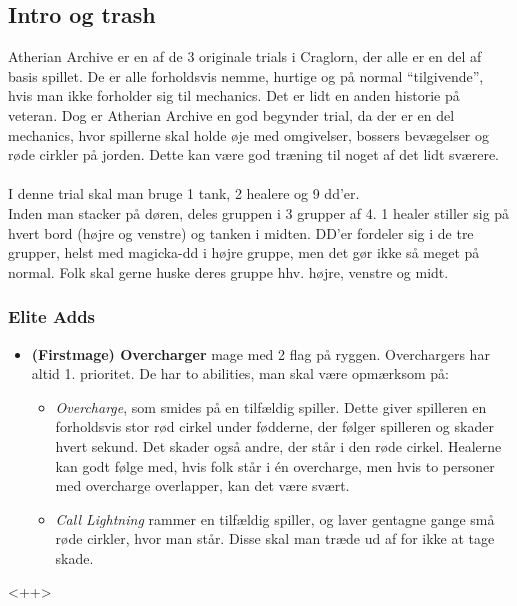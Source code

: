 \subsection*{Intro og trash}
Atherian Archive er en af de 3 originale trials i Craglorn, der alle er en del
af basis spillet. De er alle forholdsvis nemme, hurtige og på normal
``tilgivende'', hvis man ikke forholder sig til mechanics. Det er lidt en anden
historie på veteran. Dog er Atherian Archive en god begynder trial, da der er
en del mechanics, hvor spillerne skal holde øje med omgivelser, bossers
bevægelser og røde cirkler på jorden. Dette kan være god træning til noget af
det lidt sværere.\\
\\
I denne trial skal man bruge 1 tank, 2 healere og 9 dd'er.\\
Inden man stacker på døren, deles gruppen i 3 grupper af 4. 1 healer stiller
sig på hvert bord (højre og venstre) og tanken i midten. DD'er fordeler sig i
de tre grupper, helst med magicka-dd i højre gruppe, men det gør ikke så meget
på normal. Folk skal gerne huske deres gruppe hhv. højre, venstre og midt.
\subsubsection*{Elite Adds}
\begin{itemize}
  \item \textbf{(Firstmage) Overcharger} mage med 2 flag på ryggen.
    Overchargers har altid 1. prioritet. De har to abilities, man skal være
    opmærksom på: 
    \begin{itemize}
      \item \emph{Overcharge}, som smides på en tilfældig spiller. Dette
        giver spilleren en forholdsvis stor rød cirkel under fødderne, der følger
        spilleren og skader hvert sekund. Det skader også andre, der står i den
        røde cirkel. Healerne kan godt følge med, hvis folk står i én
        overcharge, men hvis to personer med overcharge overlapper, kan det
        være svært.
      \item \emph{Call Lightning} rammer en tilfældig spiller, og laver
        gentagne gange små røde cirkler, hvor man står. Disse skal man træde ud 
        af for ikke at tage skade.
    \end{itemize}
\end{itemize}<++>
